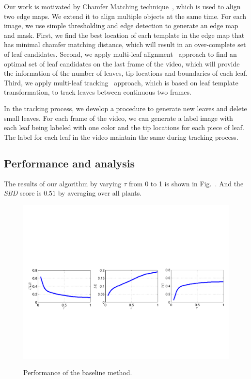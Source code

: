 Our work is motivated by Chamfer Matching technique~\cite{barrow1977parametric}, which is used to align two edge maps.
We extend it to align multiple objects at the same time.
For each image, we use simple thresholding and edge detection to generate an edge map and mask.
First, we find the best location of each template in the edge map that has minimal chamfer matching distance, which will result in an over-complete set of leaf candidates.
Second, we apply multi-leaf alignment~\cite{yin2014a} approach to find an optimal set of leaf candidates on the last frame of the video, which will provide the information of the number of leaves, tip locations and boundaries of each leaf.
Third, we apply multi-leaf tracking~\cite{yin2014b} approach, which is based on leaf template transformation, to track leaves between continuous two frames.

In the tracking process, we develop a procedure to generate new leaves and delete small leaves.
For each frame of the video, we can generate a label image with each leaf being labeled with one color and the tip locations for each piece of leaf.
The label for each leaf in the video maintain the same during tracking process.


\subsection{Performance and analysis}
The results of our algorithm by varying $\tau$ from 0 to 1 is shown in Fig.~.
And the {\it{SBD}} score is $0.51$ by averaging over all plants.

\begin{figure}
\centering
\includegraphics[width=.98\textwidth]{Figures/performance}\\
\caption{Performance of the baseline method.}
\label{fig:performance}
\end{figure}



